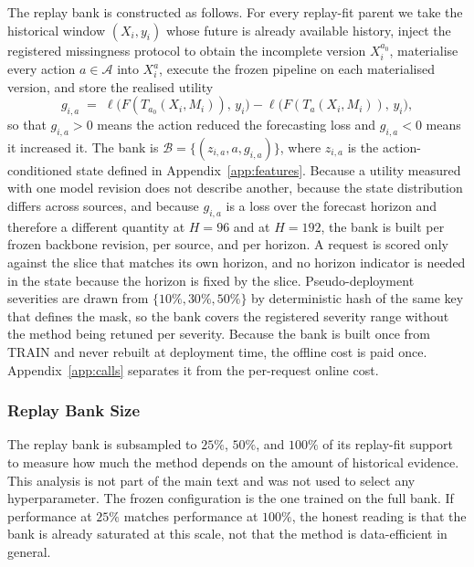 \documentclass{article}
\newcommand{\calA}{\mathcal{A}}
\newcommand{\calB}{\mathcal{B}}
\newcommand{\loss}{\ell}
\begin{document}
The replay bank is constructed as follows. For every replay-fit parent we take the historical
window $(X_i, y_i)$ whose future is already available history, inject the registered
missingness protocol to obtain the incomplete version $X_i^{a_0}$, materialise every action
$a \in \calA$ into $X_i^{a}$, execute the frozen pipeline on each materialised version, and
store the realised utility
\begin{equation}
  g_{i,a} \;=\; \loss\big(F(T_{a_0}(X_i, M_i)),\, y_i\big) - \loss\big(F(T_{a}(X_i, M_i)),\, y_i\big),
  \label{eq:app-gain}
\end{equation}
so that $g_{i,a} > 0$ means the action reduced the forecasting loss and $g_{i,a} < 0$ means it
increased it. The bank is
$\calB = \{(z_{i,a}, a, g_{i,a})\}$, where $z_{i,a}$ is the action-conditioned state defined
in Appendix~\ref{app:features}. Because a utility measured with one model revision does not
describe another, because the state distribution differs across sources, and because $g_{i,a}$
is a loss over the forecast horizon and therefore a different quantity at $H=96$ and at
$H=192$, the bank is built per frozen backbone revision, per source, and per horizon. A request
is scored only against the slice that matches its own horizon, and no horizon indicator is
needed in the state because the horizon is fixed by the slice. Pseudo-deployment severities are drawn from
$\{10\%, 30\%, 50\%\}$ by deterministic hash of the same key that defines the mask, so the
bank covers the registered severity range without the method being retuned per severity.
Because the bank is built once from TRAIN and never rebuilt at deployment time, the offline
cost is paid once. Appendix~\ref{app:calls} separates it from the per-request online cost.

\subsubsection{Replay Bank Size}
\label{app:replaysize}
The replay bank is subsampled to $25\%$, $50\%$, and $100\%$ of its replay-fit support to
measure how much the method depends on the amount of historical evidence. This analysis is
not part of the main text and was not used to select any hyperparameter. The frozen
configuration is the one trained on the full bank. If performance at $25\%$ matches
performance at $100\%$, the honest reading is that the bank is already saturated at this
scale, not that the method is data-efficient in general.
\end{document}

